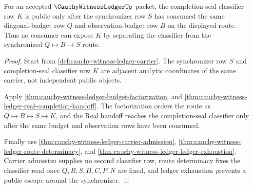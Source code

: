 \begin{theorem}
\label{thm:cauchy-witness-ledger-synchronizer-classifier-lock}
For an accepted $\CauchyWitnessLedgerUp$ packet, the completion-seal classifier row $K$ is public only after the synchronizer row $S$ has consumed the same diagonal-budget row $Q$ and observation-budget row $B$ on the displayed route. Thus no consumer can expose $K$ by separating the classifier from the synchronized $Q \longmapsto B \longmapsto S$ route.
\end{theorem}
\begin{proof}
Start from \autoref{def:cauchy-witness-ledger-carrier}. The synchronizer row $S$ and completion-seal classifier row $K$ are adjacent analytic coordinates of the same carrier, not independent public objects.

Apply \autoref{thm:cauchy-witness-ledger-budget-factorization} and \autoref{thm:cauchy-witness-ledger-real-completion-handoff}. The factorization orders the route as $Q \longmapsto B \longmapsto S \longmapsto K$, and the Real handoff reaches the completion-seal classifier only after the same budget and observation rows have been consumed.

Finally use \autoref{thm:cauchy-witness-ledger-carrier-admission}, \autoref{thm:cauchy-witness-ledger-route-determinacy}, and \autoref{thm:cauchy-witness-ledger-ledger-exhaustion}. Carrier admission supplies no second classifier row, route determinacy fixes the classifier read once $Q,B,S,H,C,P,N$ are fixed, and ledger exhaustion prevents a public escape around the synchronizer.
\end{proof}

